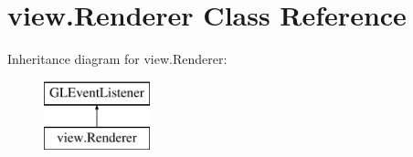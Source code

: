 \hypertarget{classview_1_1_renderer}{\section{view.\-Renderer Class Reference}
\label{classview_1_1_renderer}
}
Inheritance diagram for view.\-Renderer\-:\begin{figure}[H]
\begin{center}
\leavevmode
\includegraphics[height=2.000000cm]{classview_1_1_renderer}
\end{center}
\end{figure}
